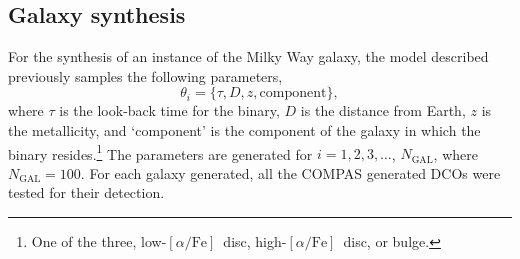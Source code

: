 \documentclass[12pt, journal, onecolumn]{IEEEtran}
\newcommand{\lowalpha}{low-$[\alpha/\text{Fe}]$}
\newcommand{\highalpha}{high-$[\alpha/\text{Fe}]$}
\begin{document}
    \subsection{Galaxy synthesis}
    \label{subsec:galaxy_synthesis}
    For the synthesis of an instance of the Milky Way galaxy, the model described previously samples the following parameters,
    \begin{equation*}
        \theta_i = \{\tau, D, z, \text{component}\},
    \end{equation*}
    where $\tau$ is the look-back time for the binary, $D$ is the distance from Earth, $z$ is the metallicity, and `component' is the component of the galaxy in which the binary resides.\footnote{One of the three, \lowalpha\ disc, \highalpha\ disc, or bulge.}
    The parameters are generated for $i = 1, 2, 3, \ldots$, $N_\text{GAL}$, where $N_\text{GAL} = 100$.
    For each galaxy generated, all the COMPAS generated DCOs were tested for their detection.
\end{document}
